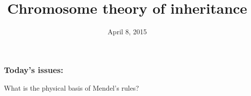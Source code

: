





\title[Chromosome theory of inheritance]{Chromosome theory of inheritance}
\date{April 8, 2015}



\begin{noheadline}
\maketitle
\end{noheadline}


\begin{noheadline}
\begin{frame}
\frametitle{Today's issues:}
What is the physical basis of Mendel's rules? \\
\vspace{5mm}
\tableofcontents[subsectionstyle=hide]
\end{frame}
\end{noheadline}

